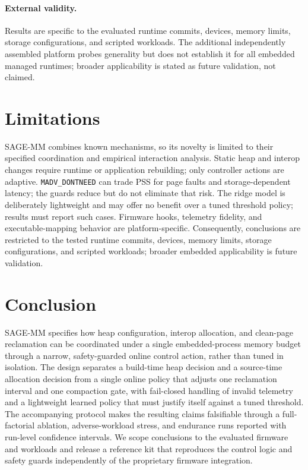 \documentclass[acmsmall,screen]{acmart}
\begin{document}
\paragraph{External validity.}
Results are specific to the evaluated runtime commits, devices, memory
limits, storage configurations, and scripted workloads. The additional
independently assembled platform probes generality but does not establish it
for all embedded managed runtimes; broader applicability is stated as future
validation, not claimed.

\section{Limitations}
\label{sec:limitations}

SAGE-MM combines known mechanisms, so its novelty is limited to their
specified coordination and empirical interaction analysis. Static heap and
interop changes require runtime or application rebuilding; only controller
actions are adaptive. \texttt{MADV\_DONTNEED} can trade PSS for page faults
and storage-dependent latency; the guards reduce but do not eliminate that
risk. The ridge model is deliberately lightweight and may offer no benefit
over a tuned threshold policy; results must report such cases. Firmware
hooks, telemetry fidelity, and executable-mapping behavior are
platform-specific. Consequently, conclusions are restricted to the tested
runtime commits, devices, memory limits, storage configurations, and
scripted workloads; broader embedded applicability is future validation.

\section{Conclusion}
\label{sec:conclusion}

SAGE-MM specifies how heap configuration, interop allocation, and clean-page
reclamation can be coordinated under a single embedded-process memory budget
through a narrow, safety-guarded online control action, rather than tuned in
isolation. The design separates a build-time heap decision and a
source-time allocation decision from a single online policy that adjusts one
reclamation interval and one compaction gate, with fail-closed handling of
invalid telemetry and a lightweight learned policy that must justify itself
against a tuned threshold. The accompanying protocol makes the resulting
claims falsifiable through a full-factorial ablation, adverse-workload
stress, and endurance runs reported with run-level confidence intervals. We
scope conclusions to the evaluated firmware and workloads and release a
reference kit that reproduces the control logic and safety guards
independently of the proprietary firmware integration.
\end{document}
